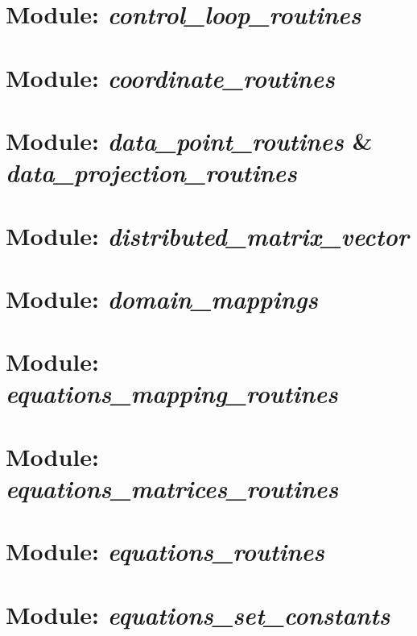 \section{Module: \emph{control\_loop\_routines}}
\label{sec:controllooproutines}

\section{Module: \emph{coordinate\_routines}}
\label{sec:coordinateroutines}

\section{Module: \emph{data\_point\_routines} \&  \\ 
\emph{data\_projection\_routines}}
\label{sec:dataprojectionroutines}

\section{Module: \emph{distributed\_matrix\_vector}}
\label{sec:distributedmatrixvector}

\section{Module: \emph{domain\_mappings}} 
\label{sec:domainmappings}

\section{Module: \emph{equations\_mapping\_routines}}
\label{sec:equationsmappingroutines}

\section{Module: \emph{equations\_matrices\_routines}}
\label{sec:equationsmatricesroutines}

\section{Module: \emph{equations\_routines}}
\label{sec:equationsroutines}

\section{Module: \emph{equations\_set\_constants}}
\label{sec:equationssetconstants}

